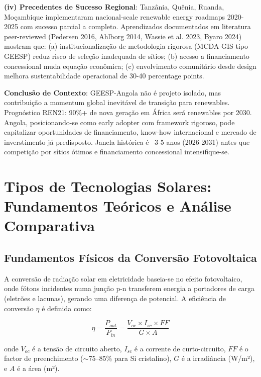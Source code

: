 \documentclass[12pt, a4paper]{article}
\begin{document}
\textbf{(iv) Precedentes de Sucesso Regional}: Tanzânia, Quênia, Ruanda, Moçambique implementaram nacional-scale renewable energy roadmaps 2020-2025 com sucesso parcial a completo. Aprendizados documentados em literatura peer-reviewed (Pedersen 2016, Ahlborg 2014, Wassie et al. 2023, Byaro 2024) mostram que: (a) institucionalização de metodologia rigorosa (MCDA-GIS tipo GEESP) reduz risco de seleção inadequada de sítios; (b) acesso a financiamento concessional muda equação econômica; (c) envolvimento comunitário desde design melhora sustentabilidade operacional de 30-40 percentage points.

\textbf{Conclusão de Contexto}: GEESP-Angola não é projeto isolado, mas contribuição a momentum global inevitável de transição para renewables. Prognóstico REN21: 90\%+ de nova geração em África será renewables por 2030. Angola, posicionando-se como early adopter com framework rigoroso, pode capitalizar oportunidades de financiamento, know-how internacional e mercado de inverstimento já predisposto. Janela histórica é ~3-5 anos (2026-2031) antes que competição por sítios ótimos e financiamento concessional intensifique-se.



\section{Tipos de Tecnologias Solares: Fundamentos Teóricos e Análise Comparativa}

\subsection{Fundamentos Físicos da Conversão Fotovoltaica}

A conversão de radiação solar em eletricidade baseia-se no efeito fotovoltaico, onde fótons incidentes numa junção p-n transferem energia a portadores de carga (eletrões e lacunas), gerando uma diferença de potencial. A eficiência de conversão $\eta$ é definida como:

\begin{equation}
\eta = \frac{P_{out}}{P_{in}} = \frac{V_{oc} \times I_{sc} \times FF}{G \times A}
\end{equation}

onde $V_{oc}$ é a tensão de circuito aberto, $I_{sc}$ é a corrente de curto-circuito, $FF$ é o factor de preenchimento ($\sim$75--85\% para Si cristalino), $G$ é a irradiância (W/m²), e $A$ é a área (m²).
\end{document}
